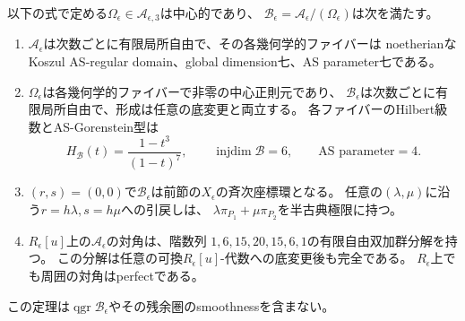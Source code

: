 \begin{theorem}[二つの非楕円成分の代数的量子化]
\label{nq:thm:family}
以下の式で定める$\Omega_\epsilon\in\mathcal A_{\epsilon,3}$は中心的であり、
$\mathcal B_\epsilon=\mathcal A_\epsilon/(\Omega_\epsilon)$は次を満たす。
\begin{enumerate}
\item $\mathcal A_\epsilon$は次数ごとに有限局所自由で、その各幾何学的ファイバーは
noetherianなKoszul AS-regular domain、global dimension七、AS parameter七である。
\item $\Omega_\epsilon$は各幾何学的ファイバーで非零の中心正則元であり、
$\mathcal B_\epsilon$は次数ごとに有限局所自由で、形成は任意の底変更と両立する。
各ファイバーのHilbert級数とAS-Gorenstein型は
\[
 H_{\mathcal B}(t)=\frac{1-t^3}{(1-t)^7},\qquad
 \operatorname{injdim}\mathcal B=6,\qquad \text{AS parameter}=4.
\]
\item $(r,s)=(0,0)$で$\mathcal B_\epsilon$は前節の$X_\epsilon$の斉次座標環となる。
任意の$(\lambda,\mu)$に沿う$r=h\lambda,s=h\mu$への引戻しは、
$\lambda\pi_{P_1}+\mu\pi_{P_2}$を半古典極限に持つ。
\item $R_\epsilon[u]$上の$\mathcal A_\epsilon$の対角は、階数列
$1,6,15,20,15,6,1$の有限自由双加群分解を持つ。
この分解は任意の可換$R_\epsilon[u]$-代数への底変更後も完全である。
$R_\epsilon$上でも周囲の対角はperfectである。
\end{enumerate}
この定理は$\operatorname{qgr}\mathcal B_\epsilon$やその残余圏のsmoothnessを含まない。
\end{theorem}

